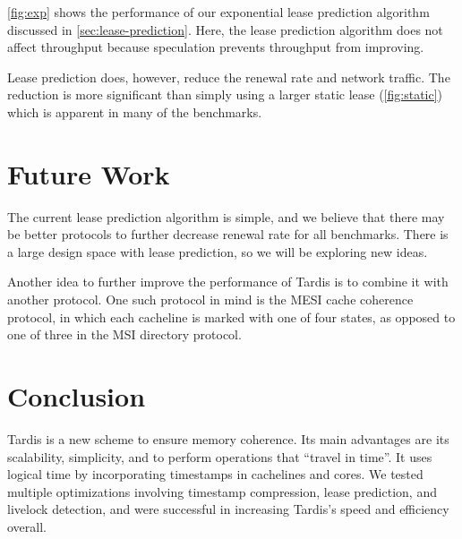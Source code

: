 \documentclass[12pt]{article}
\begin{document}
\cref{fig:exp} shows the performance of our exponential lease 
prediction algorithm discussed in \cref{sec:lease-prediction}. 
Here, the lease prediction algorithm does not affect throughput 
because speculation prevents throughput from improving.

Lease prediction does, however, reduce the renewal rate and network 
traffic. The reduction is more significant than simply using a larger 
static lease (\cref{fig:static}) which is apparent in many of the 
benchmarks.

\section{Future Work}

The current lease prediction algorithm is simple, and we believe that 
there may be better protocols to further decrease renewal rate for all 
benchmarks. There is a large design space with lease prediction, so we 
will be exploring new ideas.

Another idea to further improve the performance of Tardis is to 
combine it with another protocol. One such protocol in mind is the 
MESI cache coherence protocol, in which each cacheline is marked with 
one of four states, as opposed to one of three in the MSI directory 
protocol.

\section{Conclusion}

Tardis is a new scheme to ensure memory coherence. Its main advantages 
are its scalability, simplicity, and to perform operations that 
``travel in time''. It uses logical time by incorporating timestamps 
in cachelines and cores. We tested multiple optimizations involving 
timestamp compression, lease prediction, and livelock detection, and 
were successful in increasing Tardis’s speed and efficiency overall.  

{
	
	
}
\end{document}
